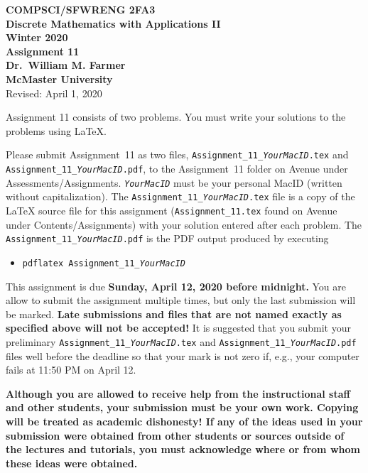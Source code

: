 \documentclass[11pt,fleqn]{article}
\begin{document}
\begin{center}

  {\large \textbf{COMPSCI/SFWRENG 2FA3}}\\[2mm]
  {\large \textbf{Discrete Mathematics with Applications II}}\\[2mm]
  {\large \textbf{Winter 2020}}\\[8mm]
  {\huge \textbf{Assignment 11}}\\[6mm]
  {\large \textbf{Dr.~William M. Farmer}}\\[2mm]
  {\large \textbf{McMaster University}}\\[6mm]
  {\large Revised: April 1, 2020}

\end{center}

\medskip

Assignment 11 consists of two problems.  You must write your solutions
to the problems using LaTeX.

Please submit Assignment~11 as two files,
\texttt{Assignment\_11\_\emph{YourMacID}.tex} and
\texttt{Assignment\_11\_\emph{YourMacID}.pdf}, to the Assignment~11
folder on Avenue under Assessments/Assignments.
\texttt{\emph{YourMacID}} must be your personal MacID (written without
capitalization).  The \texttt{Assignment\_11\_\emph{YourMacID}.tex}
file is a copy of the LaTeX source file for this assignment
(\texttt{Assignment\_11.tex} found on Avenue under
Contents/Assignments) with your solution entered after each problem.
The \texttt{Assignment\_11\_\emph{YourMacID}.pdf} is the PDF output
produced by executing

\begin{itemize}

  \item[] \texttt{pdflatex Assignment\_11\_\emph{YourMacID}}

\end{itemize}

This assignment is due \textbf{Sunday, April 12, 2020 before
  midnight.}  You are allow to submit the assignment multiple times,
but only the last submission will be marked.  \textbf{Late submissions
  and files that are not named exactly as specified above will not be
  accepted!}  It is suggested that you submit your preliminary
\texttt{Assignment\_11\_\emph{YourMacID}.tex} and
\texttt{Assignment\_11\_\emph{YourMacID}.pdf} files well before the
deadline so that your mark is not zero if, e.g., your computer fails
at 11:50 PM on April 12.

\textbf{Although you are allowed to receive help from the
  instructional staff and other students, your submission must be your
  own work.  Copying will be treated as academic dishonesty! If any of
  the ideas used in your submission were obtained from other students
  or sources outside of the lectures and tutorials, you must
  acknowledge where or from whom these ideas were obtained.}
\end{document}
